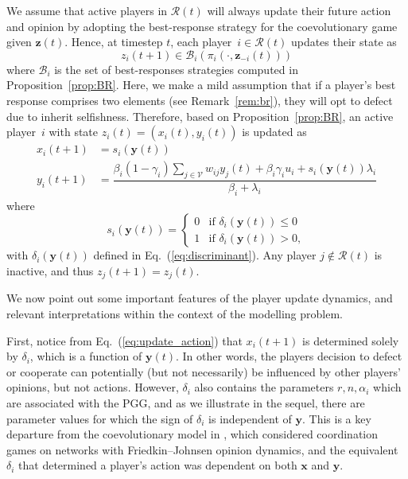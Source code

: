 \documentclass[letterpaper, 10 pt, conference]{ieeeconf}  %
\newcommand{\vect}[1]{\boldsymbol{#1}}
\renewcommand{\eqref}[1]{Eq.~(\ref{#1})}  %
\begin{document}
We assume that active players in $\mathcal R(t)$ will always update their future action and opinion by adopting the best-response strategy for the coevolutionary game given $\vect z(t)$. Hence, at timestep $t$, each player~$i \in \mathcal{R}(t)$ updates their state as
\begin{equation}
    z_i(t+1) \in \mathcal{B}_i(\pi_i(\cdot,\boldsymbol{z}_{-i}(t)))
\end{equation}
where $\mathcal{B}_i$ is the set of best-responses strategies computed in Proposition~\ref{prop:BR}. Here, we make a mild assumption that if a player's best response comprises two elements (see Remark~\ref{rem:br}), they will opt to defect due to inherit selfishness. Therefore, based on Proposition~\ref{prop:BR}, an active player~$i$ with state $z_i(t)=(x_i(t),y_i(t))$ is updated as 
\begin{align}
    x_i(t+1) &= s_i(\vect{y}(t)) \label{eq:update_action} \\
    y_i(t+1) &= \dfrac{\beta_i(1\!-\!\gamma_i)\sum_{j\in\mathcal V} w_{ij}y_j(t)\!+\!\beta_i\gamma_iu_i\!+\!s_i(\vect y(t))\lambda_i}{\beta_i+\lambda_i} \label{eq:update_opinion}
\end{align}
where
\begin{equation} \label{eq:update_s}
    s_i(\vect{y}(t)) = \left\{\begin{array}{ll}0&\text{if }\delta_i(\vect{y}(t))\leq 0\\
    1&\text{if }\delta_i(\vect{y}(t))>0,\end{array}\right.
\end{equation}
with $\delta_i(\vect{y}(t))$ defined in \eqref{eq:discriminant}. Any player $j \notin \mathcal{R}(t)$ is inactive, and thus $z_j(t+1)=z_j(t)$. 

We now point out some important features of the player update dynamics, and relevant interpretations within the context of the modelling problem. 

First, notice from \eqref{eq:update_action} that $x_i(t+1)$ is determined solely by $\delta_i$, which is a function of $\vect y(t)$. In other words, the players decision to defect or cooperate can potentially (but not necessarily) be influenced by other players' opinions, but not actions. However, $\delta_i$ also contains the parameters $r,n,\alpha_i$ which are associated with the PGG, and as we illustrate in the sequel, there are parameter values for which the sign of $\delta_i$ is independent of $\vect y$. This is a key departure from the coevolutionary model in \cite{aghbolagh_coevolutionary_2023}, which considered coordination games on networks with Friedkin--Johnsen opinion dynamics, and the equivalent $\delta_i$ that determined a player's action was dependent on both $\vect x$ and $\vect y$.
\end{document}

